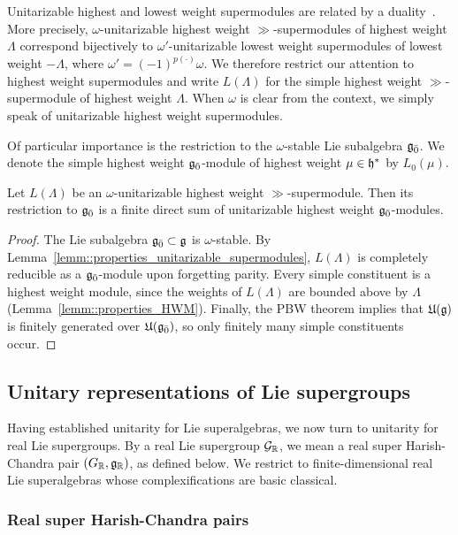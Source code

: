 Unitarizable highest and lowest weight supermodules are related by a duality~\cite{Schmidt_unitary_branching}. More precisely, $\omega$-unitarizable highest weight $\gg$-supermodules of highest weight $\Lambda$ correspond bijectively to $\omega'$-unitarizable lowest weight supermodules of lowest weight $-\Lambda$, where $\omega'=(-1)^{p(\cdot)}\omega$. We therefore restrict our attention to highest weight supermodules and write $L(\Lambda)$ for the simple highest weight $\gg$-supermodule of highest weight $\Lambda$. When $\omega$ is clear from the context, we simply speak of unitarizable highest weight supermodules.

Of particular importance is the restriction to the $\omega$-stable Lie subalgebra ${\mathfrak{g}_{\bar{0}}}$. We denote the simple highest weight ${\mathfrak{g}_{\bar{0}}}$-module of highest weight $\mu\in{\mathfrak h}^{\ast}$ by $L_0(\mu)$.

\begin{lemma}\label{lemm::restriction_even}
Let $L(\Lambda)$ be an $\omega$-unitarizable highest weight $\gg$-supermodule. Then its restriction to ${\mathfrak{g}_{\bar{0}}}$ is a finite direct sum of unitarizable highest weight ${\mathfrak{g}_{\bar{0}}}$-modules.
\end{lemma}

\begin{proof} 
The Lie subalgebra ${\mathfrak{g}_{\bar{0}}}\subset{\mathfrak{g}}$ is $\omega$-stable. By Lemma~\ref{lemm::properties_unitarizable_supermodules}, $L(\Lambda)$ is completely reducible as a ${\mathfrak{g}_{\bar{0}}}$-module upon forgetting parity. Every simple constituent is a highest weight module, since the weights of $L(\Lambda)$ are bounded above by $\Lambda$ (Lemma~\ref{lemm::properties_HWM}). Finally, the PBW theorem implies that ${\mathfrak U}({\mathfrak{g}})$ is finitely generated over ${\mathfrak U}({\mathfrak{g}_{\bar{0}}})$, so only finitely many simple constituents occur.
\end{proof}

\subsection{Unitary representations of Lie supergroups}
\label{subsec::unitary_representations_lie_supergroups}

Having established unitarity for Lie superalgebras, we now turn to unitarity for real Lie supergroups. By a real Lie supergroup ${\mathcal{G}}_{{\mathbb R}}$, we mean a real super Harish-Chandra pair $(G_{{\mathbb R}},{\mathfrak{g}}_{{\mathbb R}})$, as defined below. We restrict to finite-dimensional real Lie superalgebras whose complexifications are basic classical.

\subsubsection{Real super Harish-Chandra pairs}

